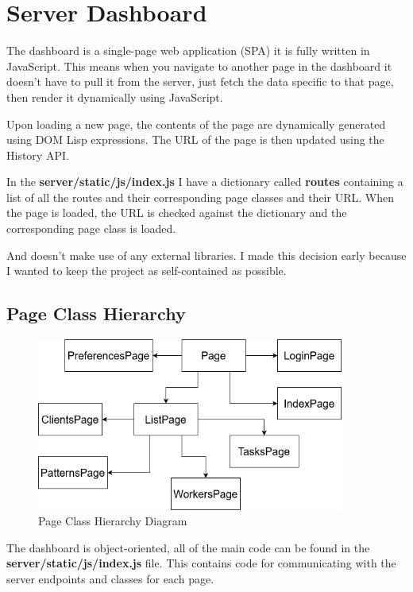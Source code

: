 \section{Server Dashboard}
The dashboard is a single-page web application (SPA) it is fully written in JavaScript.
This means when you navigate to another page in the dashboard it doesn't have to pull it from the server, just fetch the data specific to that page, then render it dynamically using JavaScript.

Upon loading a new page, the contents of the page are
dynamically generated using DOM Lisp expressions.
The URL of the page is then updated using the History API.

In the \textbf{server/static/js/index.js} I have a dictionary called
\textbf{routes} containing a list of all the routes and their corresponding
page classes and their URL.
When the page is loaded, the URL is checked against the dictionary
and the corresponding page class is loaded.

And doesn't make use of any external libraries.
I made this decision early because I wanted to keep the project as self-contained as possible.

\subsection {Page Class Hierarchy}

\begin{figure}[h!]
    \includegraphics[width=0.9\textwidth]{images/dashboard_hierarchy.drawio}
    \caption{Page Class Hierarchy Diagram}
    \label{image:sysArchitecture}
\end{figure}

The dashboard is object-oriented,
all of the main code can be found in the \textbf{server/static/js/index.js} file.
This contains code for communicating with the server endpoints and classes for each page.

